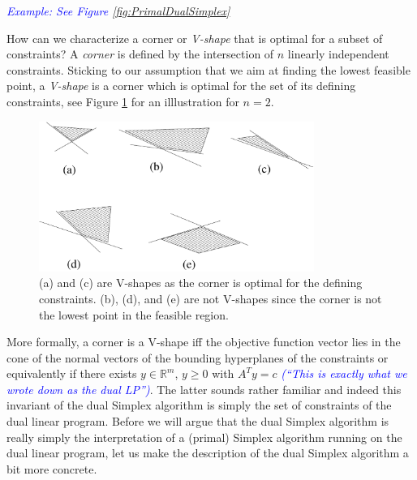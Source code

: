\documentclass{article}
\begin{document}
\textcolor{blue}{\emph{Example: See Figure \ref{fig:PrimalDualSimplex}}}

How can we characterize a corner or \emph{V-shape} that is optimal for a subset of constraints? A \emph{corner} is defined by the intersection of $n$ linearly independent constraints. Sticking to our assumption that we aim at finding the lowest feasible point, a \emph{V-shape} is a corner which is optimal for the set of its defining constraints, see Figure \ref{fig:Vshapes} for an illlustration for $n=2$.

\begin{figure}
\begin{center}
\includegraphics[width=0.8\textwidth]{Figs/Vshape.pdf}
\caption{(a) and (c) are V-shapes as the corner is optimal for the defining constraints. (b), (d), and (e) are not V-shapes since the corner is not the lowest point in the feasible region.}\label{fig:Vshapes}
\end{center}
\end{figure}

More formally, a corner is a V-shape iff the objective function vector lies in the cone of the normal vectors of the bounding hyperplanes of the constraints or equivalently if there exists $y\in \mathbb{R}^m$, $y\geq 0$ with $A^Ty=c$ \textcolor{blue}{\emph{(``This is exactly what we wrote down as the dual LP'')}}. The latter sounds rather familiar and indeed this invariant of the dual Simplex algorithm is simply the set of constraints of the dual linear program. Before we will argue that the dual Simplex algorithm is really simply the interpretation of a (primal) Simplex algorithm running on the dual linear program, let us make  the description of the dual Simplex algorithm a bit more concrete.
\end{document}
